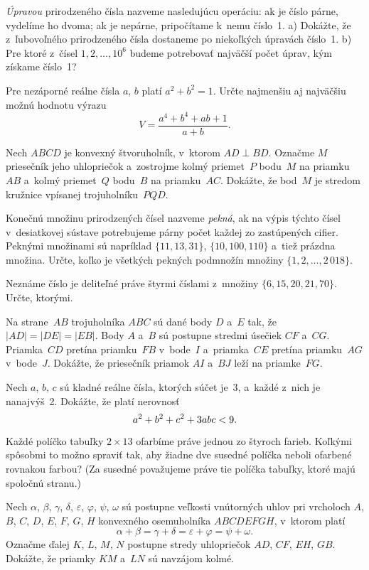 {%
{\it Úpravou\/} prirodzeného čísla nazveme nasledujúcu operáciu:
ak je číslo párne, vydelíme ho dvoma; ak je nepárne, pripočítame
k~nemu číslo~1.
\ite a) Dokážte, že z~ľubovoľného prirodzeného čísla dostaneme po
niekoľkých úpravách číslo~1.
\ite b) Pre ktoré z~čísel $1, 2, \dots, 10^6$ budeme potrebovať
najväčší počet úprav, kým získame číslo~1?\endgraf}

{%
Pre nezáporné reálne čísla $a$, $b$ platí $a^2+b^2=1$. Určte
najmenšiu aj najväčšiu možnú hodnotu výrazu
$$
V=\frac{a^4+b^4+ab+1}{a+b}.
$$}

{%
Nech $ABCD$ je konvexný štvoruholník, v~ktorom $AD\perp BD$. Označme $M$
priesečník jeho uhlopriečok a~zostrojme kolmý priemet~$P$ bodu~$M$ na
priamku~$AB$ a~kolmý priemet~$Q$ bodu~$B$ na priamku~$AC$.
Dokážte, že bod~$M$ je stredom kružnice vpísanej trojuholníku~$PQD$.}

{%
Konečnú množinu prirodzených čísel nazveme {\it pekná},
ak na výpis týchto čísel v~desiatkovej sústave potrebujeme
párny počet každej zo zastúpených cifier. Peknými množinami sú
napríklad $\{11,13,31\}$, $\{10,100,110\}$ a~tiež prázdna
množina. Určte, koľko je všetkých pekných podmnožín množiny
$\{1,2,\dots,2\,018\}$.}

{%
Neznáme číslo je deliteľné práve štyrmi číslami z~množiny $\{6,15,20,21,70\}$.
Určte, ktorými.}

{%
Na strane~$AB$ trojuholníka $ABC$ sú dané body $D$ a~$E$ tak, že $|AD|=|DE|=|EB|$.
Body $A$ a~$B$ sú postupne stredmi úsečiek $CF$ a~$CG$. Priamka~$CD$ pretína priamku~$FB$
v~bode~$I$ a~priamka~$CE$ pretína priamku~$AG$ v~bode~$J$. Dokážte, že priesečník
priamok $AI$ a~$BJ$ leží na priamke~$FG$.}

{%
Nech $a$, $b$, $c$ sú kladné reálne čísla, ktorých súčet je~3, a~každé z~nich
je nanajvýš~2. Dokážte, že platí nerovnosť
$$
\belowdisplayskip 0pt
a^2+b^2+c^2+3abc<9.
$$}

{%
Každé políčko tabuľky $2\times 13$ ofarbíme práve jednou zo štyroch farieb.
Koľkými spôsobmi to možno spraviť tak, aby žiadne dve susedné políčka
neboli ofarbené rovnakou farbou? (Za susedné považujeme práve tie políčka tabuľky,
ktoré majú spoločnú stranu.)}

{%
Nech $\alpha$, $\beta$, $\gamma$, $\delta$, $\varepsilon$, $\varphi$, $\psi$,
$\omega$ sú postupne veľkosti vnútorných uhlov
pri vrcholoch $A$, $B$, $C$, $D$, $E$, $F$, $G$, $H$ konvexného osemuholníka $ABCDEFGH$,
v~ktorom platí
$$
\alpha +\beta =\gamma +\delta =\varepsilon +\varphi = \psi +\omega.
$$
Označme ďalej $K$, $L$, $M$, $N$ postupne stredy uhlopriečok $AD$, $CF$, $EH$, $GB$.
Dokážte, že priamky $KM$ a~$LN$ sú navzájom kolmé.}

